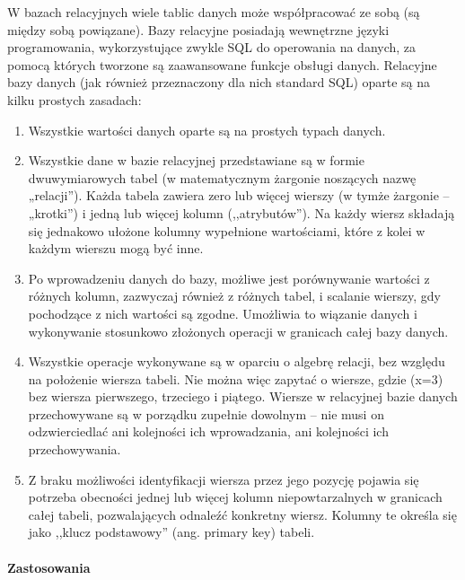 \documentclass[]{report}
\begin{document}
W bazach relacyjnych wiele tablic danych może współpracować ze sobą (są między sobą powiązane). Bazy relacyjne posiadają wewnętrzne języki programowania, wykorzystujące zwykle SQL do operowania na danych, za pomocą których tworzone są zaawansowane funkcje obsługi danych. Relacyjne bazy danych (jak również przeznaczony dla nich standard SQL) oparte są na kilku prostych zasadach:

\begin{enumerate}
\item Wszystkie wartości danych oparte są na prostych typach danych.
\item Wszystkie dane w bazie relacyjnej przedstawiane są w formie dwuwymiarowych tabel (w matematycznym żargonie noszących nazwę „relacji”). Każda tabela zawiera zero lub więcej wierszy (w tymże żargonie – „krotki”) i jedną lub więcej kolumn (,,atrybutów''). Na każdy wiersz składają się jednakowo ułożone kolumny wypełnione wartościami, które z kolei w każdym wierszu mogą być inne.
\item Po wprowadzeniu danych do bazy, możliwe jest porównywanie wartości z różnych kolumn, zazwyczaj również z różnych tabel, i scalanie wierszy, gdy pochodzące z nich wartości są zgodne. Umożliwia to wiązanie danych i wykonywanie stosunkowo złożonych operacji w granicach całej bazy danych.
\item Wszystkie operacje wykonywane są w oparciu o algebrę relacji, bez względu na położenie wiersza tabeli. Nie można więc zapytać o wiersze, gdzie (x=3) bez wiersza pierwszego, trzeciego i piątego. Wiersze w relacyjnej bazie danych przechowywane są w porządku zupełnie dowolnym – nie musi on odzwierciedlać ani kolejności ich wprowadzania, ani kolejności ich przechowywania.
\item Z braku możliwości identyfikacji wiersza przez jego pozycję pojawia się potrzeba obecności jednej lub więcej kolumn niepowtarzalnych w granicach całej tabeli, pozwalających odnaleźć konkretny wiersz. Kolumny te określa się jako ,,klucz podstawowy'' (ang. primary key) tabeli.
\end{enumerate}

\paragraph{Zastosowania}
\end{document}
